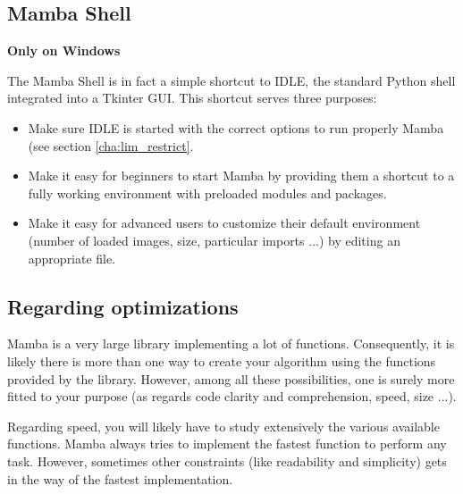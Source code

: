 \documentclass[a4paper,10pt,oneside]{article}
\begin{document}
\subsection{Mamba Shell}
\label{cha:mamba_shell}

\textbf{Only on Windows}

The Mamba Shell is in fact a simple shortcut to IDLE, the standard Python shell
integrated into a Tkinter GUI. This shortcut serves three purposes:

\begin{itemize}
\item Make sure IDLE is started with the correct options to run properly Mamba
(see section \ref{cha:lim_restrict}.
\item Make it easy for beginners to start Mamba by providing them a shortcut
to a fully working environment with preloaded modules and packages.
\item Make it easy for advanced users to customize their default environment
(number of loaded images, size, particular imports ...) by editing an appropriate
file.
\end{itemize}


\subsection{Regarding optimizations}


Mamba is a very large library implementing a lot of functions. Consequently, it
is likely there is more than one way to create your algorithm using the functions
provided by the library. However, among all these possibilities, one is surely more
fitted to your purpose (as regards code clarity and comprehension, speed, size ...).

Regarding speed, you will likely have to study extensively the various
available functions. Mamba always tries to implement the fastest function to 
perform any task. However, sometimes other constraints (like readability and
simplicity) gets in the way of the fastest implementation.
\end{document}
